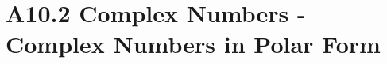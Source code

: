 \chapter{A10.2 Complex Numbers - Complex Numbers in Polar Form}\label{sec:A10.2}


\clearpage

\clearpage
